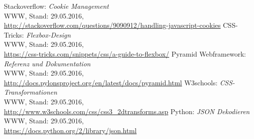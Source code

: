 

\begin{thebibliography}{999}

 Stackoverflow: \textit{Cookie Management}\\ 
			{\small WWW, Stand: 29.05.2016,}\\ 			
			\url{http://stackoverflow.com/questions/9090912/handling-javascript-cookies}
 CSS-Tricks: \textit{Flexbox-Design}\\ 
			{\small WWW, Stand: 29.05.2016,}\\ 			
			\url{https://css-tricks.com/snippets/css/a-guide-to-flexbox/}
 Pyramid Webframework: \textit{Referenz und Dokumentation}\\ 
			{\small WWW, Stand: 29.05.2016,}\\ 			
			\url{http://docs.pylonsproject.org/en/latest/docs/pyramid.html}
 W3schools: \textit{CSS-Transformationen}\\ 
			{\small WWW, Stand: 29.05.2016,}\\ 			
			\url{http://www.w3schools.com/css/css3_2dtransforms.asp}
 Python: \textit{JSON Dekodieren}\\ 
			{\small WWW, Stand: 29.05.2016,}\\ 			
			\url{https://docs.python.org/2/library/json.html}

	
\end{thebibliography}
